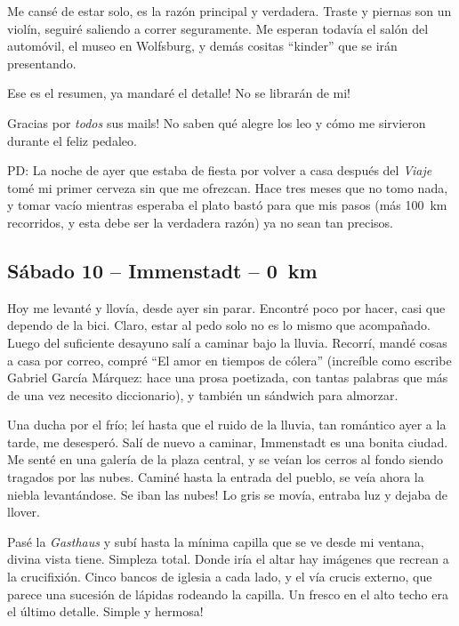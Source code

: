 Me cans\'e de estar solo, es la raz\'on principal y verdadera. Traste y
piernas son un viol\'in, seguir\'e saliendo a correr seguramente. Me esperan
todav\'ia el sal\'on del autom\'ovil, el museo en Wolfsburg, y dem\'as cositas
``kinder'' que se ir\'an presentando.

Ese es el resumen, \textexclamdown ya mandar\'e el detalle! \textexclamdown No
se librar\'an de mi!

\textexclamdown Gracias por \emph{todos} sus mails! No saben qu\'e alegre los
leo y c\'omo me sirvieron durante el feliz pedaleo.

PD: La noche de ayer que estaba de fiesta por volver a casa despu\'es del
\emph{Viaje} tom\'e mi primer cerveza sin que me ofrezcan. Hace tres meses que
no tomo nada, y tomar vac\'io mientras esperaba el plato bast\'o para que mis
pasos (m\'as 100~km recorridos, y esta debe ser la verdadera raz\'on) ya no
sean tan precisos.

\subsection*{S\'abado 10 -- Immenstadt -- 0~km}

Hoy me levant\'e y llov\'ia, desde ayer sin parar. Encontr\'e poco por hacer,
casi que dependo de la bici. Claro, estar al pedo solo no es lo mismo que
acompa\~nado. Luego del suficiente desayuno sal\'i a caminar bajo la lluvia.
Recorr\'i, mand\'e cosas a casa por correo, compr\'e ``El amor en tiempos de
c\'olera'' (incre\'ible como escribe Gabriel Garc\'ia M\'arquez: hace una
prosa poetizada, con tantas palabras que m\'as de una vez necesito
diccionario), y tambi\'en un s\'andwich para almorzar.

Una ducha por el fr\'io; le\'i hasta que el ruido de la lluvia, tan
rom\'antico ayer a la tarde, me desesper\'o. Sal\'i de nuevo a caminar,
Immenstadt es una bonita ciudad. Me sent\'e en una galer\'ia de la plaza
central, y se ve\'ian los cerros al fondo siendo tragados por las nubes.
Camin\'e hasta la entrada del pueblo, se ve\'ia ahora la niebla
levant\'andose. \textexclamdown Se iban las nubes! Lo gris se mov\'ia, entraba
luz y dejaba de llover.

Pas\'e la \emph{Gasthaus} y sub\'i hasta la m\'inima capilla que se ve desde
mi ventana, divina vista tiene. Simpleza total. Donde ir\'ia el altar hay
im\'agenes que recrean a la crucifixi\'on. Cinco bancos de iglesia a cada
lado, y el v\'ia crucis externo, que parece una sucesi\'on de l\'apidas
rodeando la capilla. Un fresco en el alto techo era el \'ultimo detalle.
\textexclamdown Simple y hermosa!

